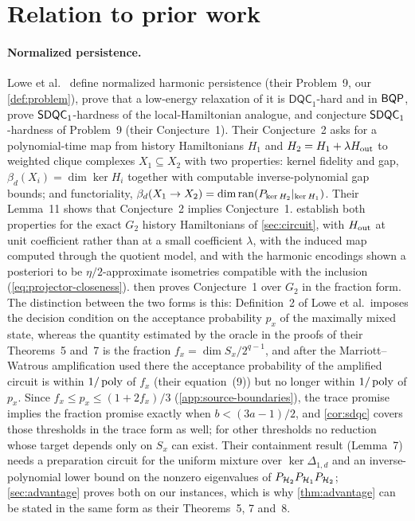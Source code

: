 \section{Relation to prior work}
\label{sec:related}

\paragraph{Normalized persistence.}
Lowe et al.~\cite{lowe2026normalized} define normalized harmonic persistence
(their Problem~9, our \cref{def:problem}), prove that a low-energy relaxation
of it is \(\mathsf{DQC}_1\)-hard and in \(\mathsf{BQP}\), prove \(\mathsf{SDQC}_{1}\)-hardness
of the local-Hamiltonian analogue, and conjecture \(\mathsf{SDQC}_{1}\)-hardness of
Problem~9 (their Conjecture~1).  Their Conjecture~2 asks for a polynomial-time
map from history Hamiltonians \(H_1\) and \(H_2=H_1+\lambda H_{\rm out}\) to
weighted clique complexes \(X_1\subseteq X_2\) with two properties:
kernel fidelity and gap, \(\beta_d(X_i)=\dim\ker H_i\) together with
computable inverse-polynomial gap bounds; and functoriality,
\(\beta_d(X_1\to X_2)=\dim\operatorname{ran}(P_{\ker H_2}|_{\ker H_1})\).  Their Lemma~11
shows that Conjecture~2 implies Conjecture~1.  
establish both properties for the exact \(G_2\) history Hamiltonians of
\cref{sec:circuit}, with \(H_{\rm out}\) at unit coefficient rather than at a
small coefficient \(\lambda\), with the induced map computed through the
quotient model, and with the harmonic encodings shown a posteriori to be
\(\eta/2\)-approximate isometries compatible with the inclusion
(\cref{eq:projector-closeness}).   then proves Conjecture~1
over \(G_2\) in the fraction form.  The distinction between the two forms is
this: Definition~2 of Lowe et al.\ imposes the decision condition on the
acceptance probability \(p_x\) of the maximally mixed state, whereas the
quantity estimated by the oracle in the proofs of their Theorems~5 and~7 is
the fraction \(f_x=\dim S_x/2^{q-1}\), and after the Marriott--Watrous
amplification used there the acceptance probability of the amplified circuit
is within \(1/\operatorname{poly}\) of \(f_x\) (their equation~(9)) but no longer within
\(1/\operatorname{poly}\) of \(p_x\).  Since \(f_x\le p_x\le(1+2f_x)/3\)
(\cref{app:source-boundaries}), the trace promise implies the fraction
promise exactly when \(b<(3a-1)/2\), and \cref{cor:sdqc} covers those
thresholds in the trace form as well; for other thresholds no reduction whose
target depends only on \(S_x\) can exist.  Their containment result
(Lemma~7) needs a preparation circuit for the uniform mixture over
\(\ker\Delta_{1,d}\) and an inverse-polynomial lower bound on the nonzero
eigenvalues of \(P_{\mathcal{H}_2}P_{\mathcal{H}_1}P_{\mathcal{H}_2}\); \cref{sec:advantage} proves
both on our instances, which is why \cref{thm:advantage} can be stated in
the same form as their Theorems~5, 7 and~8.

